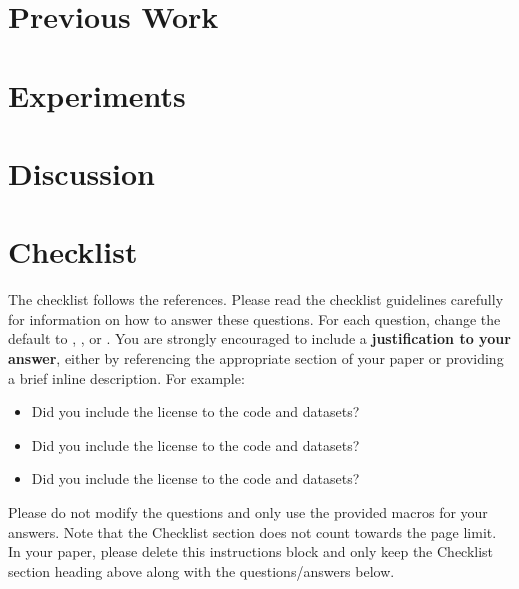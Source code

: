 \documentclass{article}
\begin{document}
\section{Previous Work}\label{previousWork}


\section{Experiments}\label{experiments}


\section{Discussion}\label{discussion}







\section*{Checklist}


The checklist follows the references.  Please
read the checklist guidelines carefully for information on how to answer these
questions.  For each question, change the default \answerTODO{} to \answerYes{},
\answerNo{}, or \answerNA{}.  You are strongly encouraged to include a {\bf
justification to your answer}, either by referencing the appropriate section of
your paper or providing a brief inline description.  For example:
\begin{itemize}
  \item Did you include the license to the code and datasets? 
  \item Did you include the license to the code and datasets? 
  \item Did you include the license to the code and datasets? \answerNA{}
\end{itemize}
Please do not modify the questions and only use the provided macros for your
answers.  Note that the Checklist section does not count towards the page
limit.  In your paper, please delete this instructions block and only keep the
Checklist section heading above along with the questions/answers below.
\end{document}
